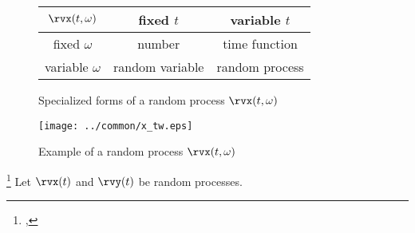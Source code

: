 \begin{figure}[ht]\color{figcolor}
\begin{center}
   \begin{tabular}{|c||c|c|}
      \hline
         $\rvx(t,\omega)$ &  fixed $t$      & variable $t$   \\
      \hline
      \hline
         fixed    $\omega$ & number          & time function  \\
      \hline
         variable $\omega$ & random variable & random process \\
      \hline
   \end{tabular}
\caption{
   Specialized forms of a random process $\rvx(t,\omega)$
   \label{fig:X(t,w)}
   }
\end{center}
\end{figure}

\begin{figure}[ht]\color{figcolor}
\begin{center}
\texttt{[image: ../common/x\_tw.eps]}
\end{center}
\caption{
  Example of a random process $\rvx(t,\omega)$
  \label{fig:X(t,w)graph}
}
\end{figure}


\begin{definition}
\footnote{
  ,
  }
\label{def:Rxx}
\label{def:opR}
\label{def:Rxy}
Let $\rvx(t)$ and $\rvy(t)$ be random processes.\\
\end{definition}

